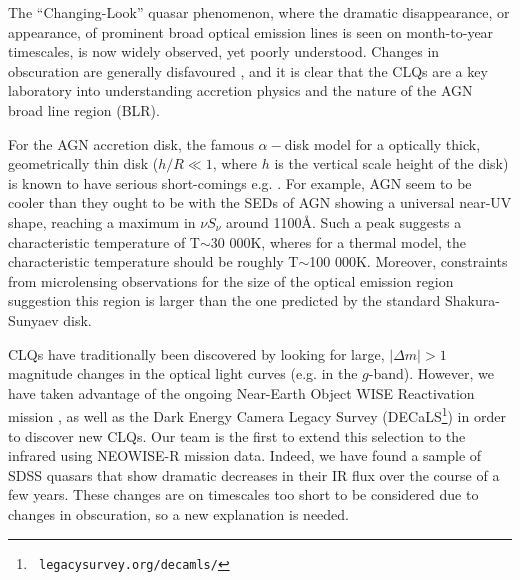 \documentclass{nature}
\begin{document}
The ``Changing-Look'' quasar phenomenon, where the dramatic
disappearance, or appearance, of prominent broad optical emission
lines is seen on month-to-year timescales, is now widely observed,
\cite{LaMassa2015, MacLeod2016, Runnoe2016, Ruan2016, Gezari2017,
Rumbaugh2017} yet poorly understood. Changes in obscuration are
generally disfavoured \cite{Hutsemekers2017, Sheng2017}, and it is
clear that the CLQs are a key laboratory into understanding accretion
physics and the nature of the AGN broad line region (BLR).

For the AGN accretion disk, the famous $\alpha-$disk model \cite{SS73}
for a optically thick, geometrically thin disk ($h / R \ll 1$, where
$h$ is the vertical scale height of the disk) is known to have serious
short-comings e.g.  \cite{Antonucci1999,
Koratkar_Blaes1999,Lawrence2012}.  For example, AGN seem to be cooler
than they ought to be \cite[e.g., ][]{Lawrence2012} with the SEDs of
AGN showing a universal near-UV shape, reaching a maximum in $\nu
S_{\nu}$ around 1100\AA.  Such a peak suggests a characteristic
temperature of T$\sim$30 000K, wheres for a thermal model, the
characteristic temperature should be roughly T$\sim$100
000K. Moreover, constraints from microlensing observations for the
size of the optical emission region \cite[e.g.,][]{Pooley2007,
Morgan2010, Morgan2012, Mosquera2011} suggestion this region is larger
than the one predicted by the standard Shakura-Sunyaev disk.

CLQs have traditionally been discovered by looking for large, $|
\Delta m | >1$ magnitude changes in the optical light curves (e.g. in
the $g$-band). However, we have taken advantage of the ongoing
Near-Earth Object WISE Reactivation mission \cite[NEOWISE-R;
][]{Mainzer2014, Meisner2017, Meisner2017b}, as well as the Dark
Energy Camera Legacy Survey (DECaLS\footnote{{\tt
legacysurvey.org/decamls/}}) in order to discover new CLQs. Our team
is the first to extend this selection to the infrared using NEOWISE-R
mission data. Indeed, we have found a sample of SDSS quasars that show
dramatic decreases in their IR flux over the course of a few
years. These changes are on timescales too short to be considered due
to changes in obscuration, so a new explanation is needed.
\end{document}
